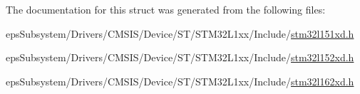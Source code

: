 The documentation for this struct was generated from the following files\-:\begin{DoxyCompactItemize}
\item 
eps\-Subsystem/\-Drivers/\-C\-M\-S\-I\-S/\-Device/\-S\-T/\-S\-T\-M32\-L1xx/\-Include/\hyperlink{stm32l151xd_8h}{stm32l151xd.\-h}\item 
eps\-Subsystem/\-Drivers/\-C\-M\-S\-I\-S/\-Device/\-S\-T/\-S\-T\-M32\-L1xx/\-Include/\hyperlink{stm32l152xd_8h}{stm32l152xd.\-h}\item 
eps\-Subsystem/\-Drivers/\-C\-M\-S\-I\-S/\-Device/\-S\-T/\-S\-T\-M32\-L1xx/\-Include/\hyperlink{stm32l162xd_8h}{stm32l162xd.\-h}\end{DoxyCompactItemize}

